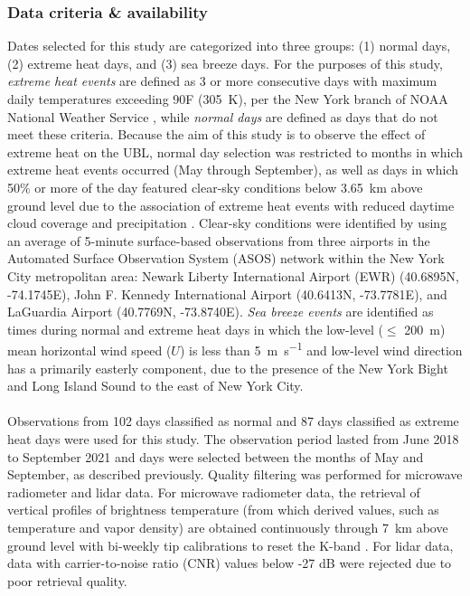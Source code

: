 \subsubsection{Data criteria \& availability}
Dates selected for this study are categorized into three groups: (1) normal days, (2) extreme heat days, and (3) sea breeze days. For the purposes of this study, \textit{extreme heat events} are defined as 3 or more consecutive days with maximum daily temperatures exceeding 90\textdegree F (\SI{305}{\kelvin}), per the New York branch of NOAA National Weather Service \citep{robinson2001, nws2018}, while \textit{normal days} are defined as days that do not meet these criteria. Because the aim of this study is to observe the effect of extreme heat on the UBL, normal day selection was restricted to months in which extreme heat events occurred (May through September), as well as days in which 50\% or more of the day featured clear-sky conditions below \SI{3.65}{\kilo\meter} above ground level due to the association of extreme heat events with reduced daytime cloud coverage and precipitation \citep{stefanon2014, thomas2020}. Clear-sky conditions were identified by using an average of 5-minute surface-based observations from three airports in the Automated Surface Observation System (ASOS) \citep{asos1998} network within the New York City metropolitan area: Newark Liberty International Airport (EWR) (40.6895\textdegree N, -74.1745\textdegree E), John F. Kennedy International Airport (40.6413\textdegree N, -73.7781\textdegree E), and LaGuardia Airport (40.7769\textdegree N, -73.8740\textdegree E). \textit{Sea breeze events} are identified as times during normal and extreme heat days in which the low-level ($\leq$ \SI{200}{\meter}) mean horizontal wind speed ($U$) is less than \SI{5}{\meter\per\second} and low-level wind direction has a primarily easterly component, due to the presence of the New York Bight and Long Island Sound to the east of New York City.
\\ \\
Observations from 102 days classified as normal and 87 days classified as extreme heat days were used for this study. The observation period lasted from June 2018 to September 2021 and days were selected between the months of May and September, as described previously. Quality filtering was performed for microwave radiometer and lidar data. For microwave radiometer data, the retrieval of vertical profiles of brightness temperature (from which derived values, such as temperature and vapor density) are obtained continuously through \SI{7}{\kilo\meter} above ground level with bi-weekly tip calibrations to reset the K-band \citep{shrestha2021}.  For lidar data, data with carrier-to-noise ratio (CNR) values below -27 dB were rejected \citep{kumer2014, shrestha2021} due to poor retrieval quality. 
